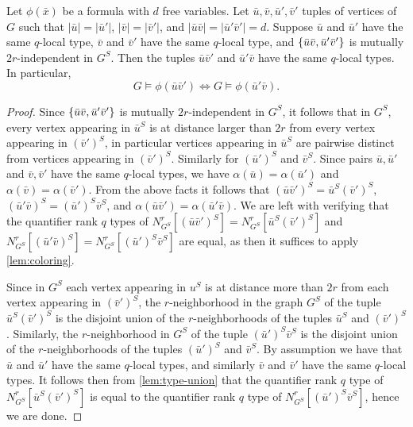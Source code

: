 \begin{lemma}\label{lem:crossing}	Let $\phi(\bar x)$ be a formula with
	 $d$ free variables.
  Let $\bar u,\bar v,\bar u',\bar v'$ tuples of vertices of $G$
  such that $|\bar u|=|\bar u'|$, $|\bar v|=|\bar v'|$, and $|\bar u\bar v|=|\bar u'\bar v'|=d$.
  Suppose $\bar u$ and $\bar u'$ have the same $q$-local type, $\bar v$ and $\bar v'$ have the same $q$-local type, and $\{\bar u\bar v,\bar u'\bar v'\}$
  is mutually $2r$-independent in $G^S$. Then 
  the tuples $\bar u\bar v'$ and $\bar u'\bar v$
  have the same $q$-local types. In particular, 
$$G\models \phi(\bar u\bar v')\iff G\models \phi(\bar u'\bar v).$$
\end{lemma}
\begin{proof}
Since $\{\bar u\bar v,\bar u'\bar v'\}$ is mutually $2r$-independent in $G^S$, it follows that in $G^S$, every vertex appearing in $\bar u^S$ is at distance larger than $2r$ from every vertex appearing in $(\bar v')^S$,
in particular vertices appearing in $\bar u^S$ are pairwise distinct from vertices appearing in $(\bar v')^S$.
Similarly for $(\bar u')^S$ and $\bar v^S$. Since pairs $\bar u,\bar u'$ and $\bar v,\bar v'$ have the same $q$-local types, we have $\alpha(\bar u)=\alpha(\bar u')$ and $\alpha(\bar v)=\alpha(\bar v')$.
From the above facts it follows that $(\bar u\bar v')^S=\bar u^S(\bar v')^S$, $(\bar u'\bar v)^S=(\bar u')^S\bar v^S$, and $\alpha(\bar u\bar v')=\alpha(\bar u'\bar v)$.
We are left with verifying that the quantifier rank $q$ types of $N^r_{G^S}[(\bar u\bar  v')^S]=N^r_{G^S}[\bar u^S(\bar  v')^S]$ and $N^r_{G^S}[(\bar u'\bar v)^S]=N^r_{G^S}[(\bar u')^S\bar  v^S]$ are equal, 
as then it suffices to apply \cref{lem:coloring}.

Since in $G^S$ each vertex appearing in $u^S$ is at distance more than $2r$ from each vertex appearing in $(\bar v')^S$, the $r$-neighborhood in the graph $G^S$
of the tuple $\bar u^S(\bar v')^S$
is the disjoint union of the $r$-neighborhoods
of the tuples $\bar u^S$ and $(\bar v')^S$.
Similarly, the $r$-neighborhood in $G^S$
of the tuple $(\bar u')^S\bar v^S$
is the disjoint union of the $r$-neighborhoods
of the tuples $(\bar u')^S$ and $\bar v^S$.
By assumption we have that $\bar u$ and $\bar u'$ have the same $q$-local types,
and similarly $\bar v$ and $\bar v'$ have the same $q$-local types.
It follows then from \cref{lem:type-union} that
the quantifier rank $q$ type of $N^r_{G^S}[\bar u^S(\bar  v')^S]$ is equal to the quantifier rank $q$ type of 
$N^r_{G^S}[(\bar u')^S\bar  v^S]$, hence we are done.
\end{proof}

